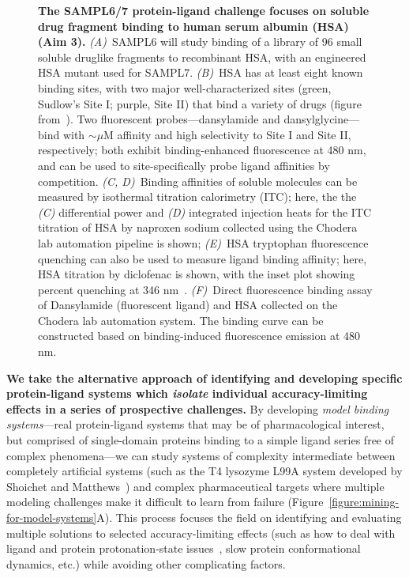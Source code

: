 \documentclass[11pt]{article}
\begin{document}
\begin{figure}[h]
\begin{centering}
\end{centering}
\vspace{-0.1in}
\caption{\footnotesize {\bf The SAMPL6/7 protein-ligand challenge focuses on soluble drug fragment binding to human serum albumin (HSA) (Aim 3).}
\emph{(A)}~SAMPL6 will study binding of a library of 96 small soluble druglike fragments to recombinant HSA, with an engineered HSA mutant used for SAMPL7.
\emph{(B)}~HSA has at least eight known binding sites, with two major well-characterized sites (green, Sudlow's Site I; purple, Site II) that bind a variety of drugs (figure from~\cite{Hall:2013:JournalofChemicalInformationandModeling}).
Two fluorescent probes---dansylamide and dansylglycine---bind with $\sim$$\mu$M affinity and high selectivity to Site I and Site II, respectively; both exhibit binding-enhanced fluorescence at 480 nm, and can be used to site-specifically probe ligand affinities by competition.
\emph{(C, D)}~Binding affinities of soluble molecules can be measured by isothermal titration calorimetry (ITC); here, the the \emph{(C)} differential power and \emph{(D)} integrated injection heats for the ITC titration of HSA by naproxen sodium collected using the Chodera lab automation pipeline is shown;
\emph{(E)}~HSA tryptophan fluorescence quenching can also be used to measure ligand binding affinity; here, HSA titration by diclofenac is shown, with the inset plot showing percent quenching at 346 nm~\cite{Epps:1999:JournalofPharmacyandPharmacology,Bou-Abdallah:2016:TheJournalofChemicalThermodynamics}.
\emph{(F)}~Direct fluorescence binding assay of Dansylamide (fluorescent ligand) and HSA collected on the Chodera lab automation system. 
The binding curve can be constructed based on binding-induced fluorescence emission at 480 nm.
\vspace{-0.25in}
\label{figure:hsa-challenge}}
\end{figure}

{\bf We take the alternative approach of identifying and developing specific protein-ligand systems which \emph{isolate} individual accuracy-limiting effects in a series of prospective challenges.}
By developing \emph{model binding systems}---real protein-ligand systems that may be of pharmacological interest, but comprised of single-domain proteins binding to a simple ligand series free of complex phenomena---we can study systems of complexity intermediate between completely artificial systems (such as the T4 lysozyme L99A system developed by Shoichet and Matthews~\cite{mobley_predicting_2007,merski_homologous_2015, mobley_predicting_2016}) and complex pharmaceutical targets where multiple modeling challenges make it difficult to learn from failure (Figure~\ref{figure:mining-for-model-systems}A).
This process focuses the field on identifying and evaluating multiple solutions to selected accuracy-limiting effects (such as how to deal with ligand and protein protonation-state issues~\cite{Onufriev:2013:QuarterlyReviewsofBiophysics}, slow protein conformational dynamics, etc.) while avoiding other complicating factors.
\end{document}
